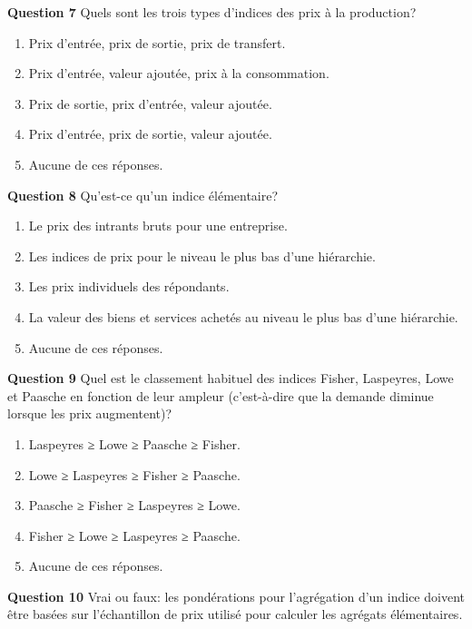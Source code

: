 \documentclass[]{article}
\begin{document}
\textbf{Question 7} Quels sont les trois types d'indices des prix à la production?

\begin{enumerate}
\def\labelenumi{\alph{enumi})}
\item
  Prix d'entrée, prix de sortie, prix de transfert.
\item
  Prix d'entrée, valeur ajoutée, prix à la consommation.
\item
  Prix de sortie, prix d'entrée, valeur ajoutée.
\item
  Prix d'entrée, prix de sortie, valeur ajoutée.
\item
  Aucune de ces réponses.
\end{enumerate}

\textbf{Question 8} Qu'est-ce qu'un indice élémentaire?

\begin{enumerate}
\def\labelenumi{\alph{enumi})}
\item
  Le prix des intrants bruts pour une entreprise.
\item
  Les indices de prix pour le niveau le plus bas d'une hiérarchie.
\item
  Les prix individuels des répondants.
\item
  La valeur des biens et services achetés au niveau le plus bas d'une hiérarchie.
\item
  Aucune de ces réponses.
\end{enumerate}

\textbf{Question 9} Quel est le classement habituel des indices Fisher, Laspeyres, Lowe et Paasche en fonction de leur ampleur (c'est-à-dire que la demande diminue lorsque les prix augmentent)?

\begin{enumerate}
\def\labelenumi{\alph{enumi})}
\item
  Laspeyres ≥ Lowe ≥ Paasche ≥ Fisher.
\item
  Lowe ≥ Laspeyres ≥ Fisher ≥ Paasche.
\item
  Paasche ≥ Fisher ≥ Laspeyres ≥ Lowe.
\item
  Fisher ≥ Lowe ≥ Laspeyres ≥ Paasche.
\item
  Aucune de ces réponses.
\end{enumerate}

\textbf{Question 10} Vrai ou faux: les pondérations pour l'agrégation d'un indice doivent être basées sur l'échantillon de prix utilisé pour calculer les agrégats élémentaires.
\end{document}
